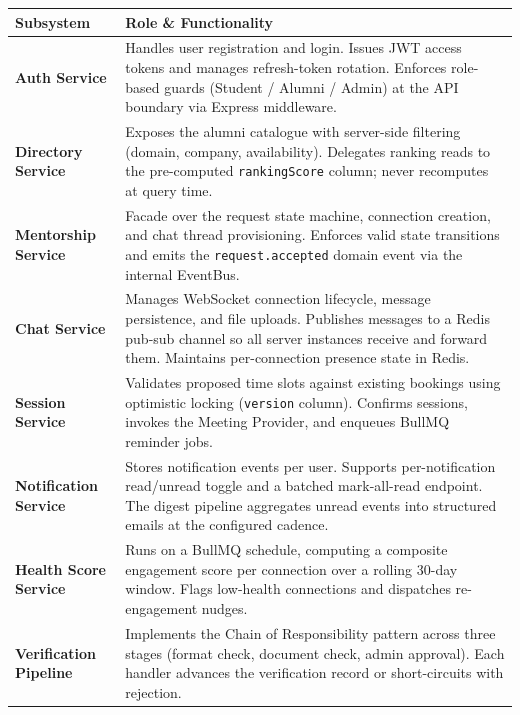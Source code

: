 \documentclass[12pt,a4paper]{article}
\begin{document}
\begin{longtable}{@{}p{3.5cm} p{9.2cm}@{}}
\toprule
\textbf{Subsystem} & \textbf{Role \& Functionality} \\
\midrule
\endhead
\textbf{Auth Service} & Handles user registration and login. Issues JWT access tokens and manages refresh-token rotation. Enforces role-based guards (Student / Alumni / Admin) at the API boundary via Express middleware. \\[4pt]
\textbf{Directory Service} & Exposes the alumni catalogue with server-side filtering (domain, company, availability). Delegates ranking reads to the pre-computed \texttt{rankingScore} column; never recomputes at query time. \\[4pt]
\textbf{Mentorship Service} & Facade over the request state machine, connection creation, and chat thread provisioning. Enforces valid state transitions and emits the \texttt{request.accepted} domain event via the internal EventBus. \\[4pt]
\textbf{Chat Service} & Manages WebSocket connection lifecycle, message persistence, and file uploads. Publishes messages to a Redis pub-sub channel so all server instances receive and forward them. Maintains per-connection presence state in Redis. \\[4pt]
\textbf{Session Service} & Validates proposed time slots against existing bookings using optimistic locking (\texttt{version} column). Confirms sessions, invokes the Meeting Provider, and enqueues BullMQ reminder jobs. \\[4pt]
\textbf{Notification Service} & Stores notification events per user. Supports per-notification read/unread toggle and a batched mark-all-read endpoint. The digest pipeline aggregates unread events into structured emails at the configured cadence. \\[4pt]
\textbf{Health Score Service} & Runs on a BullMQ schedule, computing a composite engagement score per connection over a rolling 30-day window. Flags low-health connections and dispatches re-engagement nudges. \\[4pt]
\textbf{Verification Pipeline} & Implements the Chain of Responsibility pattern across three stages (format check, document check, admin approval). Each handler advances the verification record or short-circuits with rejection. \\
\bottomrule
\end{longtable}

\newpage

\end{document}
